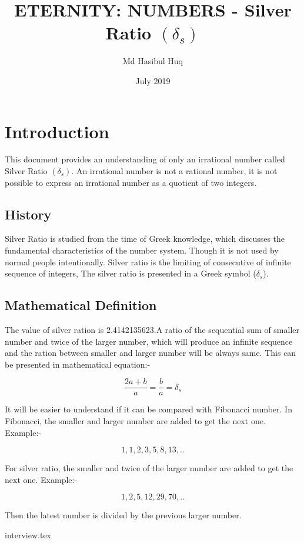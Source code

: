 \documentclass{article}
\title{ETERNITY: NUMBERS - Silver Ratio $(\delta_s)$}
\author{Md Hasibul Huq}
\date{July 2019}
\begin{document}
\maketitle

\section{Introduction}          %

This document provides an understanding of only an irrational  number called Silver Ratio $(\delta_s)$. An irrational  number is  not  a rational  number, it is  not possible to express an irrational number as a quotient of two integers.
\subsection{History}
Silver Ratio is studied from the time of Greek knowledge, which discusses the fundamental characteristics of the number system. Though it is not used by normal people intentionally. Silver ratio is the limiting of consecutive  of infinite sequence of integers, The silver ratio is presented in a Greek symbol ($\delta_s$).

\subsection{Mathematical Definition}
The value of silver ration is 2.4142135623.A ratio of the sequential sum of smaller number and twice of the larger number, which will produce an infinite sequence and the ration between smaller and larger number will be always same. This can be presented in mathematical equation:- 

\[ \dfrac{2a + b}{a}  = \dfrac{b}{a} = \delta_s \] \newline

It will be easier to understand if it can be compared with Fibonacci number.
In Fibonacci, the smaller and larger number are added to get the next one. 
Example:-

\[1,1,2,3,5,8,13,..\] \newline

For silver ratio, the smaller and twice of the larger number are added to get the next one. Example:-

\[1,2,5,12,29,70,..\] 

Then the latest number is divided  by the previous larger number. 

{interview.tex}

 
\end{document}
